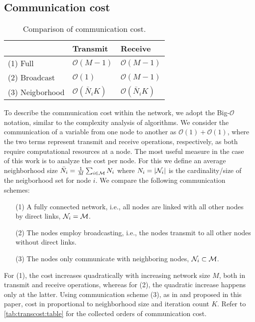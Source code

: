 \documentclass{article}
\begin{document}
\subsection[]{Communication cost}
\label{sec:transcost}
\begin{table}[t]
    \centering
    \begin{tabular}{ |l|l|l| } 
        \hline
        & Transmit & Receive \\
        \hline\hline
        (1) Full & \(\mathcal{O}(M-1)\) & \(\mathcal{O}(M-1)\) \\
        \hline
        (2) Broadcast & \(\mathcal{O}(1)\) & \(\mathcal{O}(M-1)\) \\ 
        \hline
        (3) Neigborhood & \(\mathcal{O}(\bar{N}_i K)\) & \(\mathcal{O}(\bar{N}_i K)\) \\ 
        \hline
    \end{tabular}
    \caption[]{Comparison of communication cost.}
    \label{tab:transcost:table}
\end{table}
To describe the communication cost within the network, we adopt the Big-\(\mathcal{O}\) notation, similar to the complexity analysis of algorithms.
We consider the communication of a variable from one node to another as \(\mathcal{O}(1)+\mathcal{O}(1)\), where the two terms represent transmit and receive operations, respectively, as both require computational resources at a node.
The most useful measure in the case of this work is to analyze the cost per node.
For this we define an average neighborhood size \(\bar{N}_i = \frac{1}{M} \sum_{i \in \mathcal{M}} N_i\) where \(N_i = | \mathcal{N}_i |\) is the cardinality/size of the neigborhood set for node \(i\).
We compare the following communication schemes:
\begin{itemize}
    \itemsep-0.2em
    \item[(1)] A fully connected network, i.e., all nodes are linked with all other nodes by direct links, \(\mathcal{N}_i = \mathcal{M}\).
    \item[(2)] The nodes employ broadcasting, i.e., the nodes transmit to all other nodes without direct links.
    \item[(3)] The nodes only communicate with neighboring nodes, \(\mathcal{N}_i \subset \mathcal{M}\).
\end{itemize}
For (1), the cost increases quadratically with increasing network size \(M\), both in transmit and receive operations, whereas for (2), the quadratic increase happens only at the latter.
Using communication scheme (3), as in \cite{yuDistributedBlindSystem2014,liuDistributedBlindIdentification2016} and proposed in this paper, cost in proportional to neighborhood size and iteration count \(K\).
Refer to \autoref{tab:transcost:table} for the collected orders of communication cost.
\end{document}
